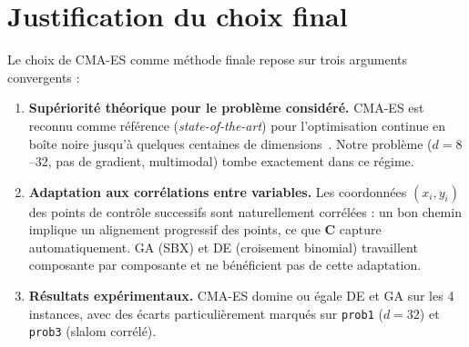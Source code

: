 \section{Justification du choix final}
\label{sec:justification}

Le choix de CMA-ES comme méthode finale repose sur trois arguments convergents :

\begin{enumerate}
  \item \textbf{Supériorité théorique pour le problème considéré.}
    CMA-ES est reconnu comme référence
    (\emph{state-of-the-art}) pour l'optimisation continue en boîte noire
    jusqu'à quelques centaines de dimensions~\cite{hansen2016}.  Notre problème
    ($d = 8$--$32$, pas de gradient, multimodal) tombe exactement dans ce régime.

  \item \textbf{Adaptation aux corrélations entre variables.}
    Les coordonnées $(x_i, y_i)$ des points de contrôle successifs sont
    naturellement corrélées : un bon chemin implique un alignement progressif
    des points, ce que $\mathbf{C}$ capture automatiquement.  GA (SBX) et DE
    (croisement binomial) travaillent composante par composante et ne
    bénéficient pas de cette adaptation.

  \item \textbf{Résultats expérimentaux.}
    CMA-ES domine ou égale DE et GA sur les 4 instances, avec des écarts
    particulièrement marqués sur \texttt{prob1} ($d = 32$) et \texttt{prob3}
    (slalom corrélé).
\end{enumerate}
